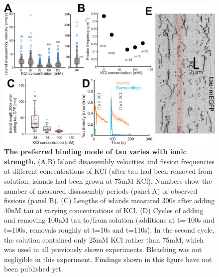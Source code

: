 \begin{figure}
	\centering
	\includegraphics[width=1\linewidth]{Figures/tausalt.png}
	\caption[The preferred binding mode of tau varies with ionic strength.]{
	\textbf{The preferred binding mode of tau varies with ionic strength.} (A,B) Island disassembly velocities and fission frequencies at different concentrations of KCl (after tau had been removed from solution; islands had been grown at 75mM KCl). Numbers show the number of measured disassembly periods (panel A) or observed fissions (panel B). (C) Lengths of islands measured 300s after adding 40nM tau at varying concentrations of KCl. (D) Cycles of adding and removing 100nM tau to/from solution (additions at t=-100s and t=100s, removals roughly at t=10s and t=110s). In the second cycle, the solution contained only 25mM KCl rather than 75mM, which was used in all previously shown experiments. Bleaching was not negligible in this experiment. Findings shown in this figure have not been published yet.
		}\label{tausalt}
\end{figure}

